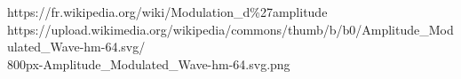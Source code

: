 \documentclass[a4paper]{article}
\begin{document}
\newpage \tableofcontents \listoffigures
\begin{thebibliography}{9}

 https://fr.wikipedia.org/wiki/Modulation\_d\%27amplitude
 https://upload.wikimedia.org/wikipedia/commons/thumb/b/b0/Amplitude\_Modulated\_Wave-hm-64.svg/\\
800px-Amplitude\_Modulated\_Wave-hm-64.svg.png

\end{thebibliography}
\end{document}
